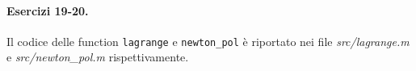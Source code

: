 \paragraph{Esercizi 19-20.} Il codice delle function \verb|lagrange| e \verb|newton_pol| è riportato nei file \emph{src/lagrange.m} e \emph{src/newton\_pol.m} rispettivamente.